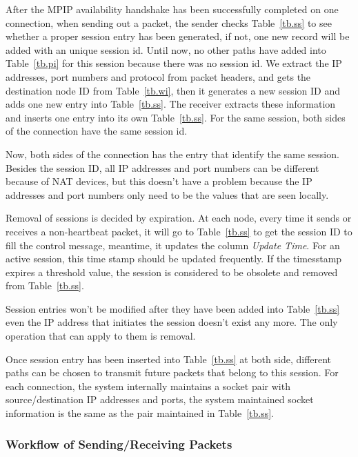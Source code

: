 After the MPIP availability handshake has been successfully completed on one connection, when sending out a packet, the sender checks Table~\ref{tb.ss} to see whether a proper session entry has been generated, if not, one new record will be added with an unique session id. Until now, no other paths have added into Table~\ref{tb.pi} for this session because there was no session id. We extract the IP addresses, port numbers and protocol from packet headers, and gets the destination node ID from Table~\ref{tb.wi}, then it generates a new session ID and adds one new entry into Table~\ref{tb.ss}. The receiver extracts these information and inserts one entry into its own Table~\ref{tb.ss}. For the same session, both sides of the connection have the same session id.

Now, both sides of the connection has the entry that identify the same session. Besides the session ID, all IP addresses and port numbers can be different because of NAT devices, but this doesn\textquoteright t have a problem because the IP addresses and port numbers only need to be the values that are seen locally.

Removal of sessions is decided by expiration. At each node, every time it sends or receives a non-heartbeat packet, it will go to Table~\ref{tb.ss} to get the session ID to fill the control message, meantime, it updates the column \emph{Update Time}. For an active session, this time stamp should be updated frequently. If the timesstamp expires a threshold value, the session is considered to be obsolete and removed from Table~\ref{tb.ss}.

Session entries won\textquoteright t be modified after they have been added into Table~\ref{tb.ss} even the IP address that initiates the session doesn\textquoteright t exist any more. The only operation that can apply to them is removal. 

Once session entry has been inserted into Table~\ref{tb.ss} at both side, different paths can be chosen to transmit future packets that belong to this session. For each connection, the system internally maintains a socket pair with source/destination IP addresses and ports, the system maintained socket information is the same as the pair maintained in Table~\ref{tb.ss}. 

\subsubsection{Workflow of Sending/Receiving Packets}


